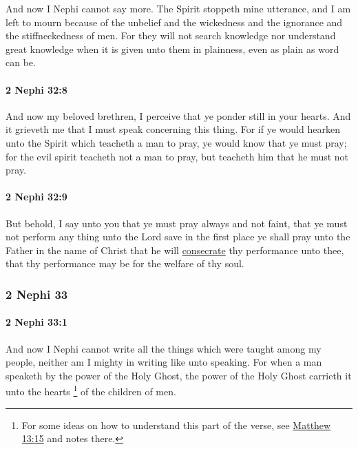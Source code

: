 			And now I Nephi cannot say more.
			The Spirit stoppeth mine utterance,
			and I am left to mourn because of the unbelief and the wickedness
			and the ignorance and the stiffneckedness of men.
			For they will not search knowledge
			nor understand great knowledge when it is given unto them in plainness,
			even as plain as word can be.

		\paragraph{2 Nephi 32:8} %
			\label{2NEPHI-32-8}

			And now my beloved brethren,
			I perceive that ye ponder still in your hearts.
			And it grieveth me that I must speak concerning this thing.
			For if ye would hearken unto the Spirit which teacheth a man to pray,
			ye would know that ye must pray;
			for the evil spirit teacheth not a man to pray,
			but teacheth him that he must not pray.

		\paragraph{2 Nephi 32:9} %
			\label{2NEPHI-32-9}
			
			But behold, I say unto you that ye must pray always and not faint,
			that ye must not perform any thing unto the Lord
			save in the first place ye shall pray unto the Father in the name of Christ
			that he will \hyperref[CONSECRATION]{consecrate} thy performance unto thee,
			that thy performance may be for the welfare of thy soul.		

	\subsubsection{2 Nephi 33} %
		\label{2NEPHI-33}
		
		\paragraph{2 Nephi 33:1} %
			\label{2NEPHI-33-1}

			And now I Nephi cannot write all the things
			which were taught among my people,
			neither am I mighty in writing like unto speaking.
			For when a man speaketh by the power of the Holy Ghost,
			the power of the Holy Ghost carrieth it unto the hearts%
				\footnote{%
					For some ideas on how to understand this part of the verse, see \hyperref[MATTHEW-13-15]{Matthew 13:15} and notes there.
					}
			of the children of men.

